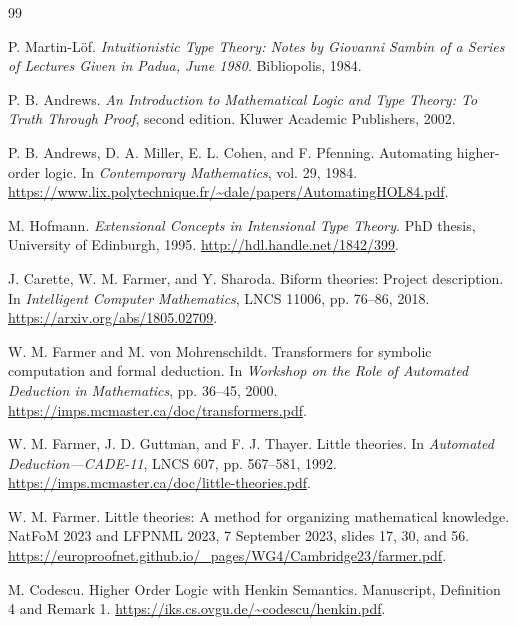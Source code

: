 \documentclass[11pt]{article}
\theoremstyle{definition}
\theoremstyle{remark}
\begin{document}
\begin{thebibliography}{99}
\raggedright

P. Martin-L\"of.
\newblock \emph{Intuitionistic Type Theory: Notes by Giovanni Sambin of a
  Series of Lectures Given in Padua, June 1980}.
\newblock Bibliopolis, 1984.

P. B. Andrews.
\newblock \emph{An Introduction to Mathematical Logic and Type Theory: To
  Truth Through Proof}, second edition.
\newblock Kluwer Academic Publishers, 2002.

P. B. Andrews, D. A. Miller, E. L. Cohen, and F. Pfenning.
\newblock Automating higher-order logic.
\newblock In \emph{Contemporary Mathematics}, vol. 29, 1984.
\newblock \url{https://www.lix.polytechnique.fr/~dale/papers/AutomatingHOL84.pdf}.

M. Hofmann.
\newblock \emph{Extensional Concepts in Intensional Type Theory}.
\newblock PhD thesis, University of Edinburgh, 1995.
\newblock \url{http://hdl.handle.net/1842/399}.

J. Carette, W. M. Farmer, and Y. Sharoda.
\newblock Biform theories: Project description.
\newblock In \emph{Intelligent Computer Mathematics}, LNCS 11006,
  pp. 76--86, 2018.
\newblock \url{https://arxiv.org/abs/1805.02709}.

W. M. Farmer and M. von Mohrenschildt.
\newblock Transformers for symbolic computation and formal deduction.
\newblock In \emph{Workshop on the Role of Automated Deduction in
  Mathematics}, pp. 36--45, 2000.
\newblock \url{https://imps.mcmaster.ca/doc/transformers.pdf}.

W. M. Farmer, J. D. Guttman, and F. J. Thayer.
\newblock Little theories.
\newblock In \emph{Automated Deduction---CADE-11}, LNCS 607,
  pp. 567--581, 1992.
\newblock \url{https://imps.mcmaster.ca/doc/little-theories.pdf}.

W. M. Farmer.
\newblock Little theories: A method for organizing mathematical knowledge.
\newblock NatFoM 2023 and LFPNML 2023, 7 September 2023, slides 17, 30, and 56.
\newblock \url{https://europroofnet.github.io/_pages/WG4/Cambridge23/farmer.pdf}.

M. Codescu.
\newblock Higher Order Logic with Henkin Semantics.
\newblock Manuscript, Definition 4 and Remark 1.
\newblock \url{https://iks.cs.ovgu.de/~codescu/henkin.pdf}.


\end{thebibliography}
\end{document}

